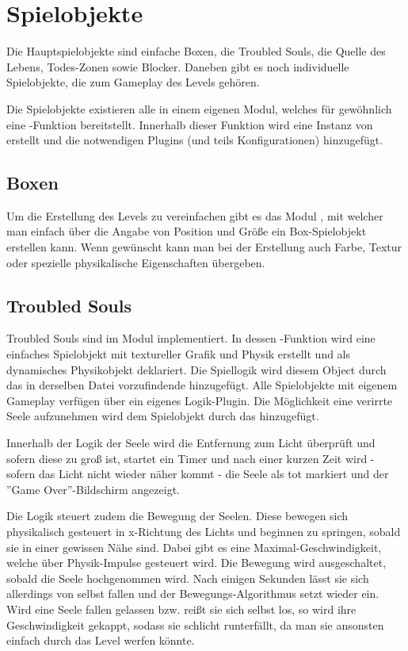 \section{Spielobjekte}

Die Hauptspielobjekte sind einfache Boxen, die Troubled Souls, die Quelle des Lebens, Todes-Zonen sowie Blocker. Daneben gibt es noch individuelle Spielobjekte, die zum Gameplay des Levels gehören.

Die Spielobjekte existieren alle in einem eigenen Modul, welches für gewöhnlich eine -Funktion bereitstellt. Innerhalb dieser Funktion wird eine Instanz von  erstellt und die notwendigen Plugins (und teils Konfigurationen) hinzugefügt.

\subsection{Boxen}

Um die Erstellung des Levels zu vereinfachen gibt es das Modul , mit welcher man einfach über die Angabe von Position und Größe ein Box-Spielobjekt erstellen kann. Wenn gewünscht kann man bei der Erstellung auch Farbe, Textur oder spezielle physikalische Eigenschaften übergeben.

\subsection{Troubled Souls}

Troubled Souls sind im Modul  implementiert. In dessen -Funktion wird eine einfaches Spielobjekt mit textureller Grafik und Physik erstellt und als dynamisches Physikobjekt deklariert. Die Spiellogik wird diesem Object durch das in derselben Datei vorzufindende  hinzugefügt. Alle Spielobjekte mit eigenem Gameplay verfügen über ein eigenes Logik-Plugin. Die Möglichkeit eine verirrte Seele aufzunehmen wird dem Spielobjekt durch das  hinzugefügt.

Innerhalb der Logik der Seele wird die Entfernung zum Licht überprüft und sofern diese zu groß ist, startet ein Timer und nach einer kurzen Zeit wird - sofern das Licht nicht wieder näher kommt -  die Seele als tot markiert und der ''Game Over''-Bildschirm angezeigt.

Die Logik steuert zudem die Bewegung der Seelen. Diese bewegen sich physikalisch gesteuert in x-Richtung des Lichts und beginnen zu springen, sobald sie in einer gewissen Nähe sind. Dabei gibt es eine Maximal-Geschwindigkeit, welche über Physik-Impulse gesteuert wird. Die Bewegung wird ausgeschaltet, sobald die Seele hochgenommen wird. Nach einigen Sekunden lässt sie sich allerdings von selbst fallen und der Bewegungs-Algorithmus setzt wieder ein. Wird eine Seele fallen gelassen bzw. reißt sie sich selbst los, so wird ihre Geschwindigkeit gekappt, sodass sie schlicht runterfällt, da man sie ansonsten einfach durch das Level werfen könnte.

